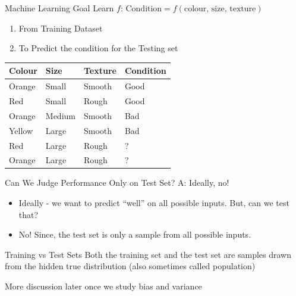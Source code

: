 \documentclass[usenames,dvipsnames]{beamer}
\begin{document}
\begin{frame}{Machine Learning Goal}
Learn $f$: 		$\text{Condition} = f(\text{colour, size, texture})$

\begin{enumerate}
	\item \pause From Training Dataset
	\item \pause To Predict the condition for the Testing set
\end{enumerate}

\begin{table}[]
	\begin{tabular}{|l|l|l||l|}
		\hline 
		
		\textbf{Colour} & \textbf{Size} & \textbf{Texture} & \textbf{Condition} \\ \hline 
		Orange & Small & Smooth  & Good      \\
		Red    & Small  & Rough  & Good \\
		Orange & Medium & Smooth & Bad \\
		Yellow & Large  & Smooth & Bad \\ \hline
		Red    & Large  & Rough  & ? \\
		Orange &  Large & Rough  & ? \\ \hline          
	\end{tabular}
\end{table}
\end{frame}

\begin{frame}{Can We Judge Performance Only on Test Set?}
A: Ideally, no!

\begin{itemize}
	\item \pause Ideally - we want to predict ``well'' on all possible inputs. But, can we test that?
	\item \pause No! Since, the test set is only a sample from all possible inputs.
\end{itemize}

\end{frame}

\begin{frame}{Training vs Test Sets}
Both the training set and the test set are samples drawn from the hidden true distribution (also sometimes called population)

\pause More discussion later once we study bias and variance
\end{frame}
\end{document}
